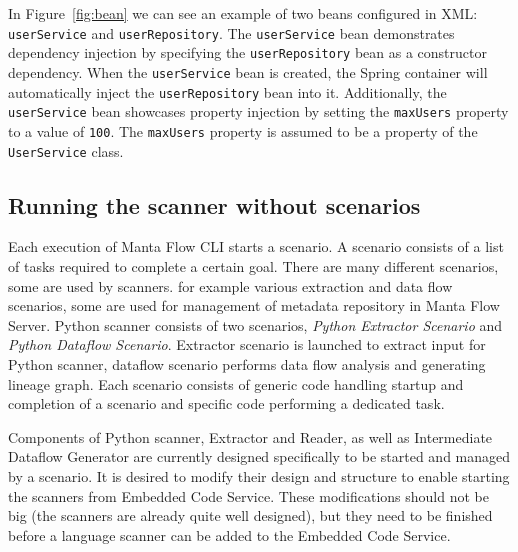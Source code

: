 \par
In Figure~\ref{fig:bean} we can see an example of two beans configured in XML: \texttt{userService} and \texttt{userRepository}. The \texttt{userService} bean demonstrates dependency injection by specifying the \texttt{userRepository} bean as a constructor dependency. When the \texttt{userService} bean is created, the Spring container will automatically inject the \texttt{userRepository} bean into it. Additionally, the \texttt{userService} bean showcases property injection by setting the \texttt{maxUsers} property to a value of \texttt{100}. The \texttt{maxUsers} property is assumed to be a property of the \texttt{UserService} class.

\subsection{Running the scanner without scenarios}
Each execution of Manta Flow CLI starts a scenario. A scenario consists of a list of tasks required to complete a certain goal. There are many different scenarios, some are used by scanners. for example various extraction and data flow scenarios, some are used for management of metadata repository in Manta Flow Server. Python scanner consists of two scenarios, \textit{Python Extractor Scenario} and \textit{Python Dataflow Scenario}. Extractor scenario is launched to extract input for Python scanner, dataflow scenario performs data flow analysis and generating lineage graph. Each scenario consists of generic code handling startup and completion of a scenario and specific code performing a dedicated task.
\par
Components of Python scanner, Extractor and Reader, as well as Intermediate Dataflow Generator are currently designed specifically to be started and managed by a scenario. It is desired to modify their design and structure to enable starting the scanners from Embedded Code Service. These modifications should not be big (the scanners are already quite well designed), but they need to be finished before a language scanner can be added to the Embedded Code Service.

